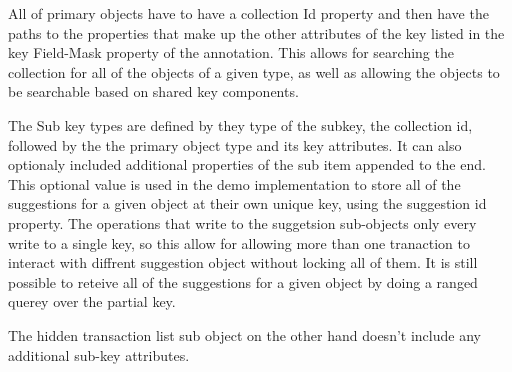 All of primary objects have to have a collection Id property and then have the paths to the properties that make up the other attributes of the key listed in the key Field-Mask property of the annotation. This allows for searching the collection for all of the objects of a given type, as well as allowing the objects to be searchable based on shared key components.

The Sub key types are defined by they type of the subkey, the collection id, followed by the the primary object type and its key attributes. It can also optionaly included additional properties of the sub item appended to the end. This optional value is used in the demo implementation to store all of the suggestions for a given object at their own unique key, using the suggestion id property. The operations that write to the suggetsion sub-objects only every write to a single key, so this allow for allowing more than one tranaction to interact with diffrent suggestion object without locking all of them. It is still possible to reteive all of the suggestions for a given object by doing a ranged querey over the partial key.

The hidden transaction list sub object on the other hand doesn't include any additional sub-key attributes. %








